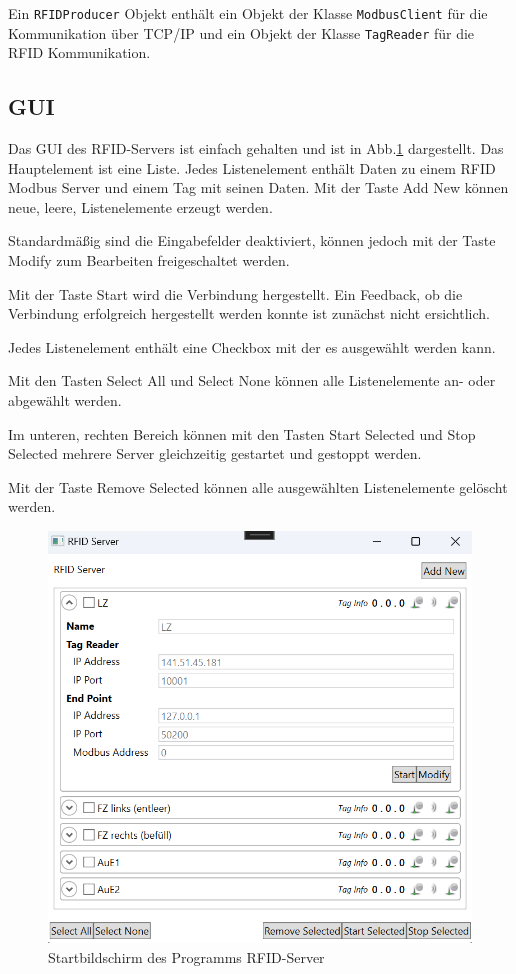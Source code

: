 Ein \verb|RFIDProducer| Objekt enthält ein Objekt der Klasse \verb|ModbusClient| für die Kommunikation über TCP/IP und
ein Objekt der Klasse \verb|TagReader| für die RFID Kommunikation.


\subsection{GUI}
Das GUI des RFID-Servers ist einfach gehalten und ist in Abb.\ref{fig:figure7} dargestellt.
Das Hauptelement ist eine Liste.
Jedes Listenelement enthält Daten zu einem RFID Modbus Server und einem Tag mit seinen Daten.
Mit der Taste \glqq Add New\grqq{} können neue, leere, Listenelemente erzeugt werden.

Standardmäßig sind die Eingabefelder deaktiviert, können jedoch mit der Taste \glqq Modify\grqq{} zum Bearbeiten
freigeschaltet werden.

Mit der Taste \glqq Start\grqq{} wird die Verbindung hergestellt. Ein Feedback, ob die Verbindung erfolgreich hergestellt
werden konnte ist zunächst nicht ersichtlich.

Jedes Listenelement enthält eine Checkbox mit der es ausgewählt werden kann.

Mit den Tasten \glqq Select All\grqq{} und \glqq Select None\grqq{} können alle Listenelemente an- oder abgewählt werden.

Im unteren, rechten Bereich können mit den Tasten \glqq Start Selected\grqq{} und \glqq Stop Selected\grqq{} mehrere Server
gleichzeitig gestartet und gestoppt werden.

Mit der Taste \glqq Remove Selected\grqq{} können alle ausgewählten Listenelemente gelöscht werden.

\begin{figure}
    \caption[Startbildschirm des Programms RFID-Server]
    {\small Startbildschirm des Programms RFID-Server}\label{fig:figure7}
    \includegraphics[height = \textwidth ]{Bilder/RFIDServer_Bildschirm}
    \centering
\end{figure}
